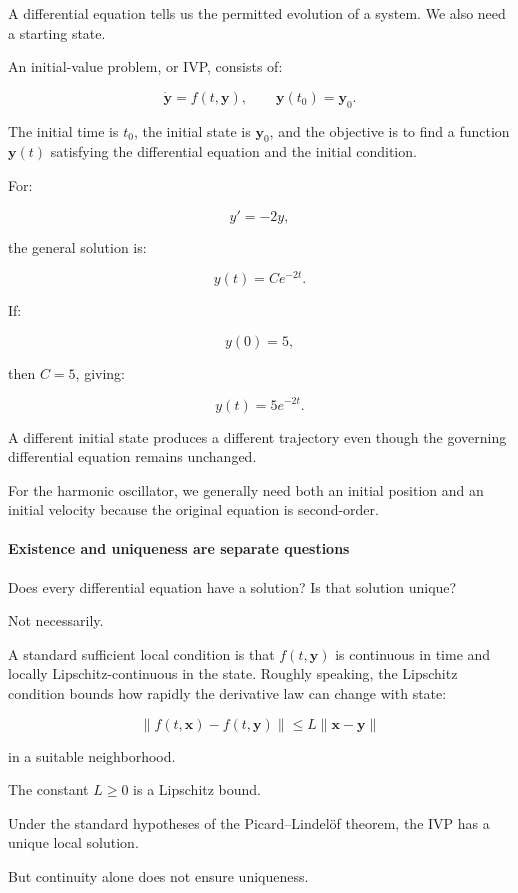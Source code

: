 A differential equation tells us the permitted evolution of a system. We also need a starting state.

An initial-value problem, or IVP, consists of:

\[
\boxed{ \dot{\mathbf y}=f(t,\mathbf y), \qquad \mathbf y(t_0)=\mathbf y_0 }.
\]

The initial time is \(t_0\), the initial state is \(\mathbf y_0\), and the objective is to find a function \(\mathbf y(t)\) satisfying the differential equation and the initial condition.

For:

\[
y'=-2y,
\]

the general solution is:

\[
y(t)=Ce^{-2t}.
\]

If:

\[
y(0)=5,
\]

then \(C=5\), giving:

\[
\boxed{y(t)=5e^{-2t}}.
\]

A different initial state produces a different trajectory even though the governing differential equation remains unchanged.

For the harmonic oscillator, we generally need both an initial position and an initial velocity because the original equation is second-order.

\paragraph{Existence and uniqueness are separate questions}\label{02-foundations-ii-ch022-existence-and-uniqueness-are-separate-questions}

Does every differential equation have a solution? Is that solution unique?

Not necessarily.

A standard sufficient local condition is that \(f(t,\mathbf y)\) is continuous in time and locally Lipschitz-continuous in the state. Roughly speaking, the Lipschitz condition bounds how rapidly the derivative law can change with state:

\[
\|f(t,\mathbf x)-f(t,\mathbf y)\| \le L\|\mathbf x-\mathbf y\|
\]

in a suitable neighborhood.

The constant \(L\ge0\) is a Lipschitz bound.

Under the standard hypotheses of the Picard--Lindelöf theorem, the IVP has a unique local solution.

But continuity alone does not ensure uniqueness.

